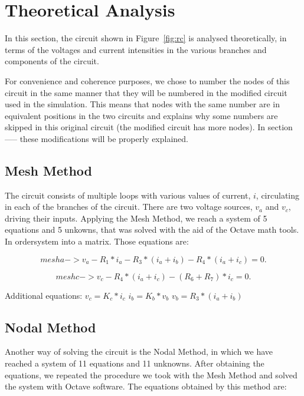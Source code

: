 \section{Theoretical Analysis}
\label{sec:analysis}

In this section, the circuit shown in Figure~\ref{fig:rc} is analysed
theoretically, in terms of the voltages and current intensities in the various branches and components of the circuit.

For convenience and coherence purposes, we chose to number the nodes of this circuit in the same manner that they will be numbered in the modified circuit used in the simulation. This means that nodes with the same number are in equivalent positions in the two circuits and explains why some numbers are skipped in this original circuit (the modified circuit has more nodes). In section ----- these modifications will be properly explained.

\subsection{Mesh Method}

The circuit consists of multiple loops with various values of current, $i$, circulating in each of the branches of the circuit. There are two
voltage sources, $v_a$ and $v_c$, driving their inputs. Applying the Mesh Method, we reach a system of 5 equations and 5 unkowns, that was solved with the aid of the Octave math tools. In ordersystem into a matrix. Those equations are:

\begin{equation}
  mesh a -> v_a - R_1*i_a - R_3*(i_a + i_b) - R_4*(i_a +i_c) = 0.
\end{equation}

\begin{equation}
  mesh c -> v_c - R_4*(i_a +i_c) - (R_6 +R_7)*i_c = 0.
\end{equation}

Additional equations:
$v_c = K_c*i_c$
$i_b = K_b*v_b$
$v_b = R_3*(i_a + i_b)$

\subsection{Nodal Method}

Another way of solving the circuit is the Nodal Method, in which we have reached a system of 11 equations and 11 unknowns. After obtaining the equations, we repeated the procedure we took with the Mesh Method and solved the system with Octave software. The equations obtained by this method are:

